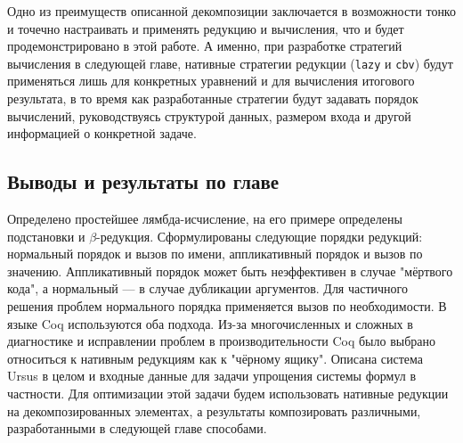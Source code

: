 \documentclass[../diploma.tex]{subfiles}
\begin{document}
Одно из преимуществ описанной декомпозиции заключается в возможности тонко и точечно настраивать и применять редукцию и вычисления, что и будет продемонстрировано в этой работе. А именно, при разработке стратегий вычисления в следующей главе, нативные стратегии редукции (\texttt{lazy} и \texttt{cbv}) будут применяться лишь для конкретных уравнений и для вычисления итогового результата, в то время как разработанные стратегии будут задавать порядок вычислений, руководствуясь структурой данных, размером входа и другой информацией о конкретной задаче.

\subsection{Выводы и результаты по главе}

Определено простейшее лямбда-исчисление, на его примере определены подстановки и $\beta$-редукция. Сформулированы следующие порядки редукций: нормальный порядок и вызов по имени, аппликативный порядок и вызов по значению. Аппликативный порядок может быть неэффективен в случае "мёртвого кода", а нормальный --- в случае дубликации аргументов. Для частичного решения проблем нормального порядка применяется вызов по необходимости. В языке Coq используются оба подхода. Из-за многочисленных и сложных в диагностике и исправлении проблем в производительности Coq было выбрано относиться к нативным редукциям как к "чёрному ящику". Описана система Ursus в целом и входные данные для задачи упрощения системы формул в частности. Для оптимизации этой задачи будем использовать нативные редукции на декомпозированных элементах, а результаты композировать различными, разработанными в следующей главе способами.
\end{document}
